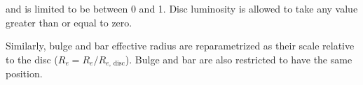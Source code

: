 \documentclass[trackchanges]{aastex63}
\begin{document}
and is limited to be between 0 and 1. Disc luminosity is allowed to take any value greater than or equal to zero.

Similarly, bulge and bar effective radius are reparametrized as their scale relative to the disc ($R_e = R_e / R_{e,\,\mathrm{disc}}$). Bulge and bar are also restricted to have the same position.






\listofchanges
\end{document}
